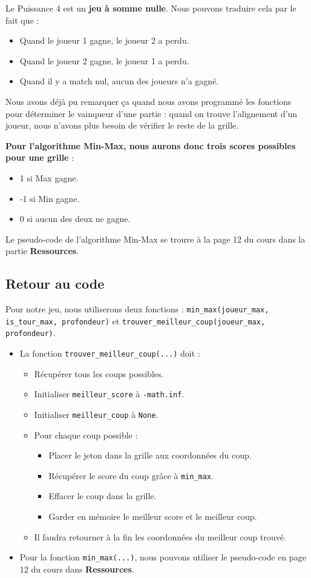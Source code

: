 \documentclass[11pt]{article}
\begin{document}
Le Puissance 4 est un \textbf{jeu à somme nulle}. Nous pouvons traduire cela par le fait que :
\begin{itemize}
\item Quand le joueur 1 gagne, le joueur 2 a perdu.
\item Quand le joueur 2 gagne, le joueur 1 a perdu.
\item Quand il y a match nul, aucun des joueurs n'a gagné.
\end{itemize}
Nous avons déjà pu remarquer ça quand nous avons programmé les fonctions pour déterminer le vainqueur d'une partie : quand on trouve l'alignement d'un joueur, nous n'avons plus besoin de vérifier le reste de la grille.

\textbf{Pour l'algorithme Min-Max, nous aurons donc trois \og scores\fg{} possibles pour une grille} :
\begin{itemize}
\item 1 si Max gagne.
\item -1 si Min gagne.
\item 0 si aucun des deux ne gagne.
\end{itemize}

Le pseudo-code de l'algorithme Min-Max se trouve à la page 12 du cours dans la partie \textbf{Ressources}.

\subsection*{Retour au code}
\label{sec:org0bbb02e}
Pour notre jeu, nous utiliserons deux fonctions : \texttt{min\_max(joueur\_max, is\_tour\_max, profondeur)} et \texttt{trouver\_meilleur\_coup(joueur\_max, profondeur)}.

\begin{itemize}
\item La fonction \texttt{trouver\_meilleur\_coup(...)} doit :
\begin{itemize}
\item Récupérer tous les coups possibles.
\item Initialiser \texttt{meilleur\_score} à \texttt{-math.inf}.
\item Initialiser \texttt{meilleur\_coup} à \texttt{None}.
\item Pour chaque coup possible :
\begin{itemize}
\item Placer le jeton dans la grille aux coordonnées du coup.
\item Récupérer le score du coup grâce à \texttt{min\_max}.
\item Effacer le coup dans la grille.
\item Garder en mémoire le meilleur score et le meilleur coup.
\end{itemize}
\item Il faudra retourner à la fin les coordonnées du meilleur coup trouvé.
\end{itemize}

\item Pour la fonction \texttt{min\_max(...)}, nous pouvons utiliser le pseudo-code en page 12 du cours dans \textbf{Ressources}.
\end{itemize}
\end{document}
